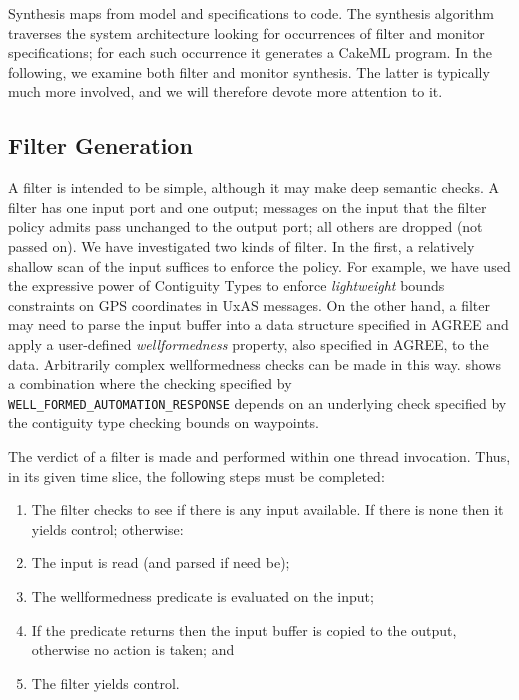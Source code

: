 Synthesis maps from model and specifications to code. 
The synthesis algorithm traverses the system architecture looking for occurrences of filter and monitor specifications;
for each such occurrence it generates a CakeML program. 
In the following, we examine both filter and monitor synthesis. 
The latter is typically much more involved, and we will therefore devote more attention to it.

\subsection{Filter Generation}

A filter is intended to be simple, although it may make deep semantic checks. 
A filter has one input port and one output; messages on the
input that the filter policy admits pass unchanged to the output port; all others are dropped (not passed on). 
We have investigated two kinds of filter. 
In the first, a relatively shallow scan of the input suffices to enforce the policy. 
For example, we have used the expressive power of Contiguity Types \cite{contiguity-types} to enforce \emph{lightweight} bounds constraints on GPS coordinates in UxAS messages.
On the other hand, a filter may need to parse the input buffer into a data structure specified in AGREE and apply a user-defined \emph{wellformedness} property, also specified in AGREE, to the data. Arbitrarily complex wellformedness checks can be made in this way.
 shows a combination where the checking specified by {\small\verb+WELL_FORMED_AUTOMATION_RESPONSE+} depends on an underlying check specified by the contiguity type checking bounds on waypoints.

The verdict of a filter is made and performed within one thread invocation.
Thus, in its given time slice, the following steps must be completed:

\begin{enumerate}

\item The filter checks to see if there is any input available.  If there is none
then it yields control; otherwise:

\item The input is read (and parsed if need be);

\item The wellformedness predicate is evaluated on the input;

\item If the predicate returns  then the input buffer
 is copied to the output, otherwise no action is taken; and

\item The filter yields control.
\end{enumerate}

